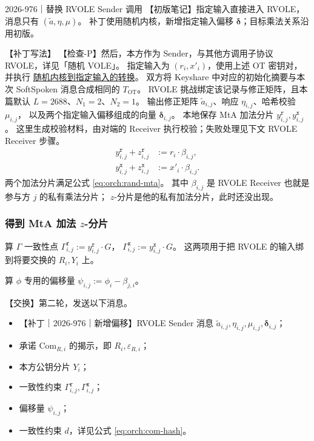 \begin{patchnote}{2026-976｜替换 RVOLE Sender 调用}
【初版笔记】指定输入直接进入 RVOLE，消息只有 $(\tilde a,\eta,\mu)$。
补丁使用随机内核，新增指定输入偏移 $\boldsymbol\delta$；目标乘法关系沿用初版。

【补丁写法】
【检查-P】然后，本方作为 Sender，与其他方调用子协议 RVOLE，详见「随机 VOLE」。
指定输入为 $(r_i,x'_i)$，使用上述 OT 密钥对，并执行
\hyperref[sec:rvole:chosen-input]{随机内核到指定输入的转换}。
双方将 Keyshare 中对应的初始化摘要与本次 SoftSpoken 消息合成相同的 $T_{\mathrm{OT}}$。
RVOLE 挑战绑定该记录与修正矩阵，且本篇默认 $L=2688$、$N_1=2$、$N_2=1$。
输出修正矩阵 $\tilde a_{i,j}$、响应 $\eta_{i,j}$、哈希校验 $\mu_{i,j}$，
以及两个指定输入偏移组成的向量 $\boldsymbol\delta_{i,j}$。
本地保存 MtA 加法分片 $y^\mathtt{r}_{i,j},y^\mathtt{x}_{i,j}$。
这里生成校验材料，由对端的 Receiver 执行校验；失败处理见下文 RVOLE Receiver 步骤。
\begin{equation}
  \label{eq:orch:rand-mta}\tag{rand-mta}
  \begin{aligned}
    y^\mathtt{r}_{i,j} + z^\mathtt{r}_{i,j} &:= r_i \cdot \beta_{i,j}, \\
    y^\mathtt{x}_{i,j} + z^\mathtt{x}_{i,j} &:= x'_i \cdot \beta_{i,j}.
  \end{aligned}
\end{equation}
两个加法分片满足公式 \eqref{eq:orch:rand-mta}。
其中 $\beta_{i,j}$ 是 RVOLE Receiver 也就是参与方 $j$ 的私有乘法分片；
$z$-分片是他的私有加法分片，此时还没出现。
\end{patchnote}

\subsubsection{得到 MtA 加法 $z$-分片}

算 $\Gamma$ 一致性点 $\Gamma^\mathtt{r}_{i,j} := y^\mathtt{r}_{i,j} \cdot G$，
$\Gamma^\mathtt{x}_{i,j} := y^\mathtt{x}_{i,j} \cdot G$。
这两项用于把 RVOLE 的输入绑到将要交换的 $R_i, Y_i$ 上。

算 $\phi$ 专用的偏移量 $\psi_{i,j} := \phi_i - \beta_{j,i}$。

【交换】第二轮，发送以下消息。
\begin{itemize}
\item
  【补丁｜2026-976｜新增偏移】RVOLE Sender 消息 $\tilde a_{i,j},\eta_{i,j},\mu_{i,j},\boldsymbol\delta_{i,j}$；
\item
  承诺 $\mathrm{Com}_{R,i}$ 的揭示，即 $R_i, \varepsilon_{R,i}$；
\item
  本方公钥分片 $Y_i$；
\item
  一致性约束 $\Gamma^\mathtt{r}_{i,j}, \Gamma^\mathtt{x}_{i,j}$；
\item
  偏移量 $\psi_{i,j}$；
\item
  一致性约束 $d$，详见公式 \eqref{eq:orch:com-hash}。
\end{itemize}


